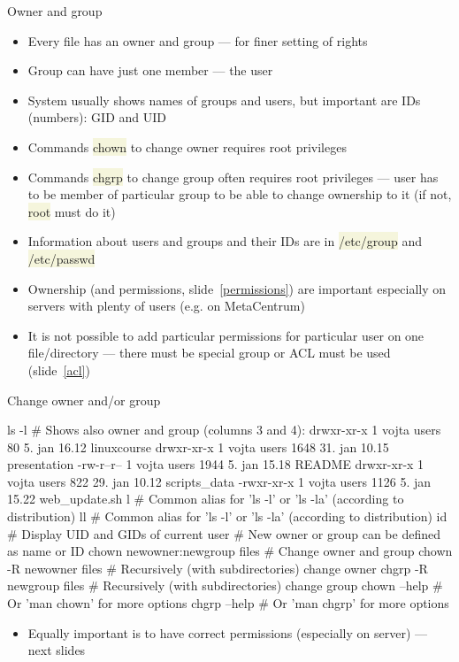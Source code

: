 \documentclass[compress, xelatex, 11pt, xcolor=svgnames, aspectratio=169,
	hyperref={
		bookmarks=true,
		unicode=true,
		colorlinks=true,
		pdftitle={Linux, command line and MetaCentrum},
		plainpages=false,
		pdfauthor={Vojtech Zeisek},
		pdfsubject={Course about use of Linux command line, writing shell scripts and using MetaCentrum of CESNET},
		pdfcreator={XeLaTeX},
		pdfkeywords={Linux, GNU, BASH, shell, command line, MetaCentrum},
		linkcolor=DarkRed, %
		anchorcolor=DarkBlue, %
		citecolor=Indigo, %
		filecolor=NavyBlue, %
		menucolor=DarkMagenta, %
		urlcolor=DarkBlue, %
		},
	url={hyphens, lowtilde} %
	]{beamer}
\renewcommand{\texttt}[1]{\colorbox{Beige}{{\ttfamily #1}}}
\begin{document}
\begin{frame}{Owner and group}
	\begin{itemize}
		\item Every file has an owner and group --- for finer setting of rights
		\item Group can have just one member --- the user
		\item System usually shows names of groups and users, but important are IDs (numbers): GID and UID
		\item Commands \texttt{chown} to change owner requires root privileges
		\item Commands \texttt{chgrp} to change group often requires root privileges --- user has to be member of particular group to be able to change ownership to it (if not, \texttt{root} must do it)
		\item Information about users and groups and their IDs are in \texttt{/etc/group} and \texttt{/etc/passwd}
		\item Ownership (and permissions, slide~\ref{permissions}) are important especially on servers with plenty of users (e.g. on MetaCentrum)
		\item It is not possible to add particular permissions for particular user on one file/directory --- there must be special group or ACL must be used (slide~\ref{acl})
	\end{itemize}
\end{frame}

\begin{frame}[fragile]{Change owner and/or group}
	\begin{bashcode}
    ls -l # Shows also owner and group (columns 3 and 4):
    drwxr-xr-x 1 vojta users    80  5. jan 16.12 linuxcourse
    drwxr-xr-x 1 vojta users  1648 31. jan 10.15 presentation
    -rw-r--r-- 1 vojta users  1944  5. jan 15.18 README
    drwxr-xr-x 1 vojta users   822 29. jan 10.12 scripts_data
    -rwxr-xr-x 1 vojta users  1126  5. jan 15.22 web_update.sh
    l # Common alias for 'ls -l' or 'ls -la' (according to distribution)
    ll # Common alias for 'ls -l' or 'ls -la' (according to distribution)
    id # Display UID and GIDs of current user
    # New owner or group can be defined as name or ID
    chown newowner:newgroup files # Change owner and group
    chown -R newowner files # Recursively (with subdirectories) change owner
    chgrp -R newgroup files # Recursively (with subdirectories) change group
    chown --help # Or 'man chown' for more options
    chgrp --help # Or 'man chgrp' for more options
	\end{bashcode}
	\begin{itemize}
		\item Equally important is to have correct permissions (especially on server) --- next slides
	\end{itemize}
\end{frame}
\end{document}
